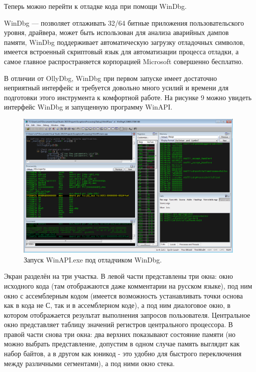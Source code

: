 \documentclass[a4paper, 12pt]{report}		%
\begin{document}
Теперь можно перейти к отладке кода при помощи WinDbg.

WinDbg — позволяет отлаживать 32/64 битные приложения пользовательского уровня, драйвера, может быть использован для анализа аварийных дампов памяти, WinDbg поддерживает автоматическую загрузку отладочных символов, имеется встроенный скриптовый язык для автоматизации процесса отладки, а самое главное распространяется корпорацией Microsoft совершенно бесплатно.

В отличии от OllyDbg, WinDbg при первом запуске имеет достаточно неприятный интерфейс и требуется довольно много усилий и времени для подготовки этого инструмента к комфортной работе. На рисунке 9 можно увидеть интерфейс WinDbg и запущенную программу WinAPI.

\begin{figure}[h!]
\centering
\includegraphics[scale=0.5]{res/002}
\caption{Запуск WinAPI.exe под отладчиком WinDbg.}
\end{figure}

Экран разделён на три участка. В левой части представлены три окна: окно исходного кода (там отображаются даже комментарии на русском языке), под ним окно с ассемблерным кодом (имеется возможность устанавливать точки основа как в кода не С, так и в ассемблерном коде), а под ним диалоговое окно, в котором отображается результат выполнения запросов пользователя. Центральное окно представляет таблицу значений регистров центрального процессора. В правой части снова три окна: два верхних показывают состояние памяти (но можно выбрать представление, допустим в одном случае память выглядит как набор байтов, а в другом как юникод - это удобно для быстрого переключения между различными сегментами), а под ними окно стека.
\end{document}

